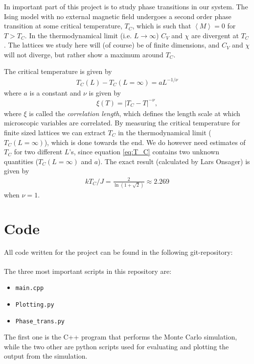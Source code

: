 \documentclass[12pt, a4paper]{article}
\begin{document}
In important part of this project is to study phase transitions in our system. The Ising model with 
no external magnetic field undergoes a second order phase transition at some critical temperature, $T_C$, 
which is such that $\left\langle M \right\rangle=0$ for $T>T_C$. In the thermodynamical limit 
(i.e. $L\rightarrow\infty$) $C_V$ and $\chi$ are divergent at $T_C$. The lattices we study here will 
(of course) be of finite dimensions, and  $C_V$ and $\chi$ will not diverge, but rather show a 
maximum around $T_C$. 

The critical temperature is given by  
\begin{align}
T_C(L) - T_C(L=\infty) = aL^{-1/\nu}
\label{eq:T_C}
\end{align}
where $a$ is a constant and $\nu$ is given by 
\begin{align*}
\xi(T) = |T_C - T|^{-\nu}, 
\end{align*}
where $\xi$ is called the \textit{correlation length}, which defines the length scale at which microscopic 
variables are correlated. By measuring the critical temperature for finite sized lattices we can 
extract $T_C$ in the thermodynamical limit ($T_C(L=\infty)$), which is done towards the end. We do 
however need estimates of $T_C$ for two different $L$'s, since equation \ref{eq:T_C} contains two 
unknown quantities ($T_C(L=\infty)$ and $a$). The exact result (calculated by Lars Onsager) is given by 
\begin{align}
k T_C/J = \frac{2}{\ln(1+ \sqrt{2})} \approx 2.269
\end{align}
when $\nu = 1$. 

\section{Code}

All code written for the project can be found in the following git-repository:  \vspace{0.5cm} \\ 
 \vspace{0.5cm} \\ 
The three most important scripts in this repository are: 
\begin{itemize}
\item \texttt{main.cpp}
\item \texttt{Plotting.py}
\item \texttt{Phase\_trans.py}
\end{itemize}
The first one is the C++ program that performs the Monte Carlo simulation, while the two other are 
python scripts used for evaluating and plotting the output from the simulation. 
\end{document}
